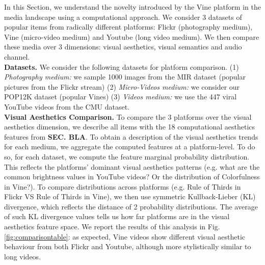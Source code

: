 In this Section, we understand the novelty introduced  by the Vine platform in the media landscape using a computational approach. We consider 3 datasets of popular items from radically different platforms: Flickr (photography medium), Vine (micro-video medium) and Youtube (long video medium). We then compare these media over 3  dimensions: visual aesthetics, visual semantics and audio channel.
%
\vspace{3pt}\\\textbf{Datasets.} We consider the following datasets for platform comparison. (1) \emph{Photography medium:} we sample 1000 images from the MIR dataset (popular pictures from the Flickr stream) (2) \emph{Micro-Videos medium:} we consider our POP12K dataset (popular Vines) (3) \emph{Videos medium:}  we use the 447 viral YouTube videos from the CMU dataset.
%
\vspace{3pt}\\\textbf{Visual Aesthetics Comparison.} 
To compare the 3 platforms over the visual aesthetics dimension, we describe all items with the 18 computational aesthetics features from \textbf{SEC. BLA}. To obtain a description of the visual aesthetics trends for each medium, we aggregate the computed features at a platform-level. To do so, for each dataset, we compute the feature marginal probability distribution. This reflects the platforms' dominant visual aesthetics patterns (e.g. what are the common brightness values in YouTube videos? Or the distribution of Colorfulness in Vine?). To compare distributions across platforms (e.g. Rule of Thirds in Flickr VS Rule of Thirds in Vine), we then use symmetric Kullback-Lieber (KL) divergence, which reflects the distance of 2 probability distributions. The average of such KL divergence values  tells us how far platforms are in the visual aesthetics feature space. We report the results of this analysis in Fig. \ref{fig:comparisontable}: as expected, Vine videos show different visual aesthetic behaviour from both Flickr and Youtube, although more stylistically similar to long videos. 
\\
